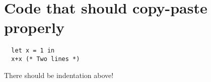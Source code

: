 \documentclass{article}
\begin{document}
\section*{Code that should copy-paste properly}
\begin{lstlisting}
  let x = 1 in
  x+x (* Two lines *)
\end{lstlisting}
There should be indentation above!
\end{document}
